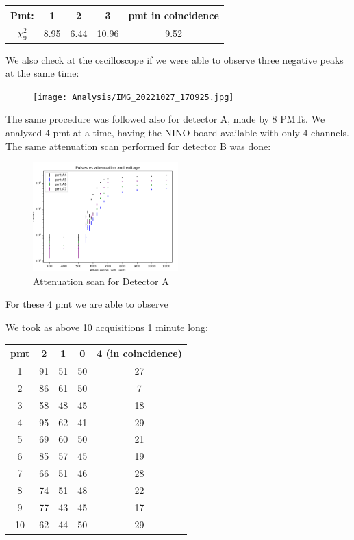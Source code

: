 \begingroup
\setlength{\tabcolsep}{8pt} %
\renewcommand{\arraystretch}{1.2} %
\begin{center}
\begin{tabular}{|c|c|c|c|c|}
\hline 
Pmt: & 1 & 2 & 3 & pmt in coincidence \\ 
\hline
$\chi^{2}_{9}$ & 8.95 & 6.44 & 10.96 & 9.52\\ 
\hline
\end{tabular} 
\end{center}
\endgroup
\smallskip

We also check at the oscilloscope if we were able to observe three negative peaks at the same time: 

\begin{figure}
\centering
\texttt{[image: Analysis/IMG\_20221027\_170925.jpg]} 
\end{figure}

The same procedure was followed also for detector A, made by 8 PMTs. We analyzed 4 pmt at a time, having the NINO board available with only 4 channels. The same attenuation scan performed for detector B was done:

\newpage
\begin{figure}[hbtp]
\centering
\includegraphics[width = 0.5\textwidth]{Analysis/AttenuationA(4-7).pdf}
\caption{Attenuation scan for Detector A}
\end{figure}

For these 4 pmt we are able to observe 


We took as above 10 acquisitions 1 minute long:

\begin{center}
\begin{tabular}{|c|c|c|c|c|}
\hline 
pmt & 2 & 1 & 0 & 4 (in coincidence) \\ 
\hline 
1 & 91 & 51 & 50 & 27 \\ 
\hline 
2 & 86 & 61 & 50 & 7 \\ 
\hline 
3 & 58 & 48 & 45 & 18 \\ 
\hline 
4 & 95 & 62 & 41 & 29 \\ 
\hline 
5 & 69 & 60 & 50 & 21 \\ 
\hline 
6 & 85 & 57 & 45 & 19 \\ 
\hline 
7 & 66 & 51 & 46 & 28 \\ 
\hline 
8 & 74 & 51 & 48 & 22 \\ 
\hline 
9 & 77 & 43 & 45 & 17 \\ 
\hline 
10 & 62 & 44 & 50 & 29 \\ 
\hline 
\end{tabular} 
\end{center}

